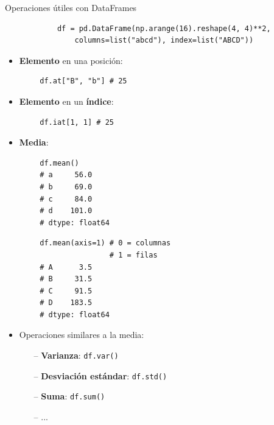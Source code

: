 \documentclass[10pt]{beamer} %
\begin{document}
\begin{frame}[fragile]{Operaciones útiles con DataFrames}
    \begin{verbatim}
            df = pd.DataFrame(np.arange(16).reshape(4, 4)**2,
                columns=list("abcd"), index=list("ABCD"))
    \end{verbatim}
    \begin{multicols}{2}
    \begin{itemize}
        \item \textbf{Elemento} en una posición:
    \end{itemize}
    \begin{verbatim}
        df.at["B", "b"] # 25
    \end{verbatim}
    
    \columnbreak
    
    \begin{itemize}
        \item \textbf{Elemento} en un \textbf{índice}:
    \end{itemize}
    \begin{verbatim}
        df.iat[1, 1] # 25
    \end{verbatim}
    \end{multicols}
    \begin{itemize}
        \item \textbf{Media}:
    \end{itemize}
    \begin{multicols}{2}
    \begin{verbatim}
        df.mean()
        # a     56.0
        # b     69.0
        # c     84.0
        # d    101.0
        # dtype: float64
    \end{verbatim}
    
    \columnbreak
    
    \begin{verbatim}
        df.mean(axis=1) # 0 = columnas
                        # 1 = filas
        # A      3.5
        # B     31.5
        # C     91.5
        # D    183.5
        # dtype: float64
    \end{verbatim}
    \end{multicols}
    
    \begin{itemize}
        \item Operaciones similares a la media:
        \begin{itemize}
            \item[--] \textbf{Varianza}: \texttt{df.var()}
            \item[--] \textbf{Desviación estándar}: \texttt{df.std()}
            \item[--] \textbf{Suma}: \texttt{df.sum()}
            \item[--] ...
        \end{itemize}
    \end{itemize}
\end{frame}
\end{document}
